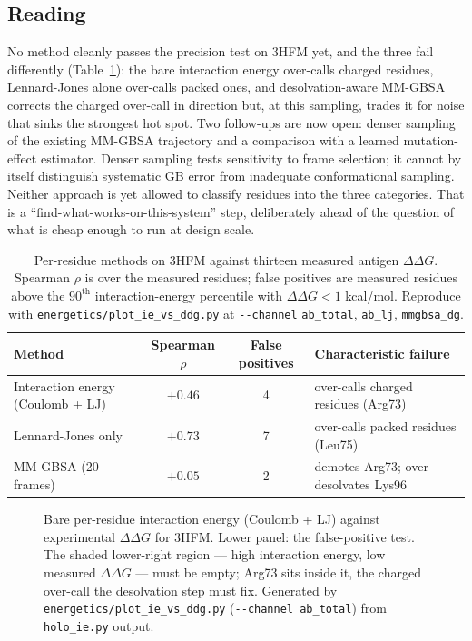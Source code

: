 \subsection{Reading}
No method cleanly passes the precision test on 3HFM yet, and the three fail differently
(Table~\ref{tab:ie_methods}): the bare interaction energy over-calls charged residues, Lennard-Jones
alone over-calls packed ones, and desolvation-aware MM-GBSA corrects the charged over-call in
direction but, at this sampling, trades it for noise that sinks the strongest hot spot. Two follow-ups are now open: denser sampling of the existing MM-GBSA trajectory and a
comparison with a learned mutation-effect estimator. Denser sampling tests sensitivity to frame
selection; it cannot by itself distinguish systematic GB error from inadequate conformational
sampling. Neither approach is yet allowed to classify residues into the three categories. That is a
``find-what-works-on-this-system'' step, deliberately ahead of the question of what is cheap enough to
run at design scale.

\begin{table}[h]
\centering
\caption{Per-residue methods on 3HFM against thirteen measured antigen $\Delta\Delta G$. Spearman
$\rho$ is over the measured residues; false positives are measured residues above the $90^{\text{th}}$
interaction-energy percentile with $\Delta\Delta G < 1$ kcal/mol. Reproduce with
\texttt{energetics/plot\_ie\_vs\_ddg.py} at \texttt{-{}-channel} \texttt{ab\_total}, \texttt{ab\_lj},
\texttt{mmgbsa\_dg}.}
\label{tab:ie_methods}
\begin{tabular}{lccl}
\toprule
Method & Spearman $\rho$ & False positives & Characteristic failure \\
\midrule
Interaction energy (Coulomb + LJ) & $+0.46$ & 4 & over-calls charged residues (Arg73) \\
Lennard-Jones only                & $+0.73$ & 7 & over-calls packed residues (Leu75) \\
MM-GBSA (20 frames)               & $+0.05$ & 2 & demotes Arg73; over-desolvates Lys96 \\
\bottomrule
\end{tabular}
\end{table}

\begin{figure}[h]
\centering
{}
\caption{Bare per-residue interaction energy (Coulomb + LJ) against experimental $\Delta\Delta G$ for
3HFM. Lower panel: the false-positive test. The shaded lower-right region --- high interaction energy,
low measured $\Delta\Delta G$ --- must be empty; Arg73 sits inside it, the charged over-call the
desolvation step must fix. Generated by \texttt{energetics/plot\_ie\_vs\_ddg.py}
(\texttt{-{}-channel ab\_total}) from \texttt{holo\_ie.py} output.}
\label{fig:ie_vs_ddg}
\end{figure}

